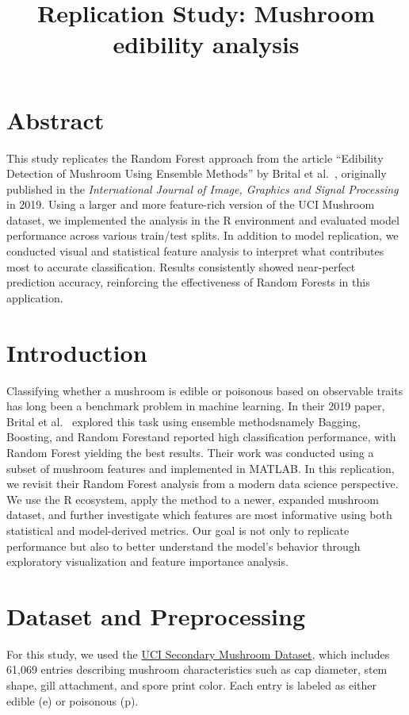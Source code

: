 \documentclass[a4paper,11pt]{article}
\title{Replication Study: Mushroom edibility analysis}
\author{}
\date{}
\begin{document}
  

\maketitle  

\section*{Abstract}
This study replicates the Random Forest approach from the article ``Edibility Detection of Mushroom Using Ensemble Methods'' by Brital et al.~\citep{brital2019edibility}, originally published in the \textit{International Journal of Image, Graphics and Signal Processing} in 2019. Using a larger and more feature-rich version of the UCI Mushroom dataset, we implemented the analysis in the R environment and evaluated model performance across various train/test splits. In addition to model replication, we conducted visual and statistical feature analysis to interpret what contributes most to accurate classification. Results consistently showed near-perfect prediction accuracy, reinforcing the effectiveness of Random Forests in this application.

\section{Introduction}
Classifying whether a mushroom is edible or poisonous based on observable traits has long been a benchmark problem in machine learning. In their 2019 paper, Brital et al.~\citep{brital2019edibility} explored this task using ensemble methods\textemdash namely Bagging, Boosting, and Random Forest\textemdash and reported high classification performance, with Random Forest yielding the best results. Their work was conducted using a subset of mushroom features and implemented in MATLAB. In this replication, we revisit their Random Forest analysis from a modern data science perspective. We use the R ecosystem, apply the method to a newer, expanded mushroom dataset, and further investigate which features are most informative using both statistical and model-derived metrics. Our goal is not only to replicate performance but also to better understand the model’s behavior through exploratory visualization and feature importance analysis.

\section{Dataset and Preprocessing}
For this study, we used the \href{https://archive.ics.uci.edu/dataset/848/secondary+mushroom+dataset}{UCI Secondary Mushroom Dataset}, which includes 61,069 entries describing mushroom characteristics such as cap diameter, stem shape, gill attachment, and spore print color. Each entry is labeled as either edible (e) or poisonous (p).
\end{document}
